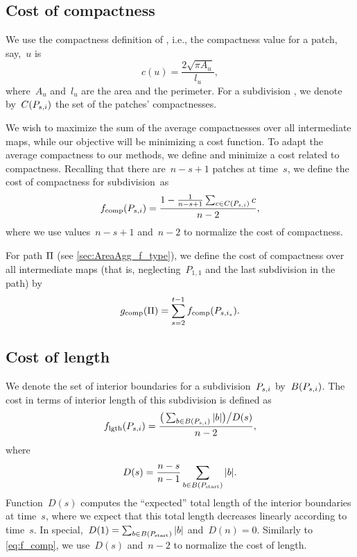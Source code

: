 \subsection{Cost of compactness}
\label{sec:AreaAgg_f_comp}

We use the compactness definition of \citet{Frolov1975}, 
i.e., the compactness value for a patch, say,~$u$ is
\begin{equation*}
\label{eq:comp}
c(u)=\frac{2 \sqrt{\pi A_u}}{l_u},
\end{equation*}
where~$A_u$ and~$l_u$ are 
the area and the perimeter. 
For a subdivision \Psnode, we denote by~$C(P_{s,i})$ 
the set of the patches' compactnesses.

We wish to maximize the sum of the average compactnesses 
over all intermediate maps,
while our objective will be
minimizing a cost function.
To adapt the average compactness to our methods, 
we define and minimize a cost related to compactness.
Recalling that there are~$n-s+1$ patches at time~$s$,
we define the cost of compactness for subdivision~\Psnode as
\begin{equation}
\label{eq:f_comp}
f_{\mathrm{comp}}(P_{s,i})=
\frac{1-\frac{1}{n-s+1} \sum_{c\in C(P_{s,i})}c}{n-2},
\end{equation}
where we use values~$n-s+1$ and~$n-2$ to normalize 
the cost of compactness.

For path $\Pi$ (see \sect\ref{sec:AreaAgg_f_type}),  
we define the cost of compactness over all 
intermediate maps
(that is, neglecting~$P_{1,1}$ 
and the last subdivision in the path) by
\begin{equation}
\label{eq:g_comp}
g_\mathrm{comp}(\Pi)=
\sum_{s=2}^{t-1}f_{\mathrm{comp}}(P_{s,i_s}).
\end{equation}


\subsection{Cost of length}
\label{sec:AreaAgg_costlength}

We denote the set of interior boundaries 
for a subdivision~$P_{s,i}$ by~$B(P_{s,i})$.
The cost in terms of interior length of 
this subdivision is defined as
\begin{equation}
\label{eq:f_length}
f_{\mathrm{lgth}}(P_{s,i})=
\frac{\big(\sum_{b\in B (P_{s,i})} 
	|b|\big)\big/D(s)}{n-2}, 
\end{equation} 
where 
\begin{equation}
\label{eq:AreaAgg_Norm}
D(s)=\frac{n-s}{n-1} \sum_{b\in B (P_\mathrm{start})} |b|.
\end{equation}
Function~$D(s)$ computes the ``expected'' total length of 
the interior boundaries at time~$s$,
where we expect that this total length decreases linearly
according to time~$s$.
In special,~$D(1) = \sum_{b\in B (P_\mathrm{start})} |b|$
and~$D(n) = 0$.
Similarly to \eq\ref{eq:f_comp}, 
we use~$D(s)$ and~$n-2$ to normalize 
the cost of length.


